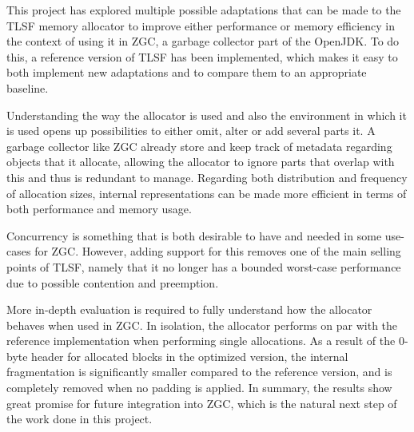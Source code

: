 
This project has explored multiple possible adaptations that can be made to the TLSF memory allocator to improve either performance or memory efficiency in the context of using it in ZGC, a garbage collector part of the OpenJDK. To do this, a reference version of TLSF has been implemented, which makes it easy to both implement new adaptations and to compare them to an appropriate baseline.

Understanding the way the allocator is used and also the environment in which it is used opens up possibilities to either omit, alter or add several parts it. A garbage collector like ZGC already store and keep track of metadata regarding objects that it allocate, allowing the allocator to ignore parts that overlap with this and thus is redundant to manage. Regarding both distribution and frequency of allocation sizes, internal representations can be made more efficient in terms of both performance and memory usage.

Concurrency is something that is both desirable to have and needed in some use-cases for ZGC. However, adding support for this removes one of the main selling points of TLSF, namely that it no longer has a bounded worst-case performance due to possible contention and preemption.

More in-depth evaluation is required to fully understand how the allocator behaves when used in ZGC. In isolation, the allocator performs on par with the reference implementation when performing single allocations. As a result of the 0-byte header for allocated blocks in the optimized version, the internal fragmentation is significantly smaller compared to the reference version, and is completely removed when no padding is applied. In summary, the results show great promise for future integration into ZGC, which is the natural next step of the work done in this project.

